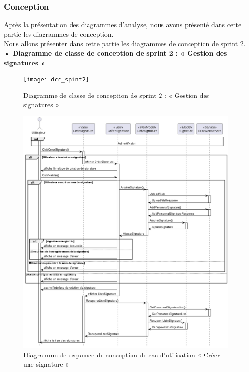 \subsubsection{Conception}

Après la présentation des diagrammes d'analyse, nous avons présenté dans cette partie les diagrammes de conception.\\ 
Nous allons présenter dans cette partie les diagrammes de conception de sprint 2. \\
\textbf{•	Diagramme de classe de conception de sprint 2 : « Gestion des signatures »}

\begin{figure}[H]
  \centering
  \texttt{[image: dcc\_spint2]}
  \caption{Diagramme de classe de conception de sprint 2 : « Gestion des signatures »}
  \label{fig:class_diagram_signatures}
\end{figure}


\begin{figure}[H]
  \centering
  \includegraphics[width=1\textwidth]{out/diagrams/signatures/sequence_create/sequence_create_signature}
  \caption{Diagramme de séquence de conception de cas d'utilisation « Créer une signature  »}
  \label{fig:sequence_conception_create_signature}
\end{figure}

